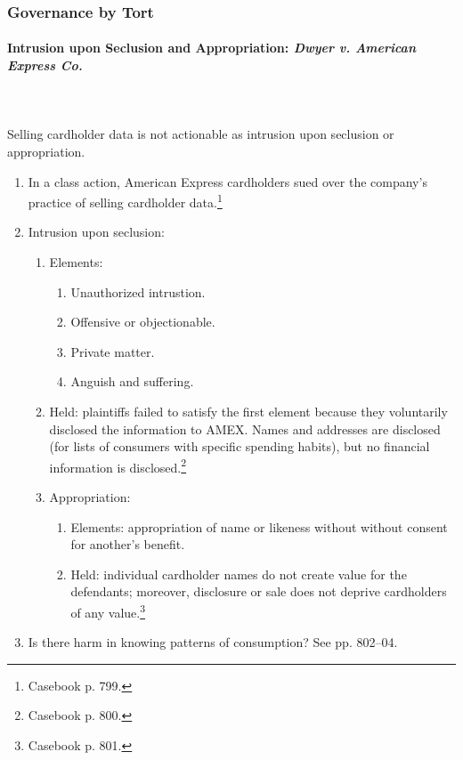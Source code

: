 \subsubsection{Governance by Tort}

\paragraph{Intrusion upon Seclusion and Appropriation: \emph{Dwyer v. American 
Express Co.}}
~\\\\
Selling cardholder data is not actionable as intrusion upon seclusion or 
appropriation.

\begin{enumerate}
    \item In a class action, American Express cardholders sued over the 
    company's practice of selling cardholder data.\footnote{Casebook p. 799.}
    \item Intrusion upon seclusion:
    \begin{enumerate}
        \item Elements:
        \begin{enumerate}
            \item Unauthorized intrustion.
            \item Offensive or objectionable.
            \item Private matter.
            \item Anguish and suffering.
        \end{enumerate}
        \item Held: plaintiffs failed to satisfy the first element because they 
        voluntarily disclosed the information to AMEX. Names and addresses are 
        disclosed (for lists of consumers with specific spending habits), but no 
        financial information is disclosed.\footnote{Casebook p. 800.}
        \item Appropriation:
        \begin{enumerate}
            \item Elements: appropriation of name or likeness without without 
            consent for another's benefit.
            \item Held: individual cardholder names do not create value for the 
            defendants; moreover, disclosure or sale does not deprive 
            cardholders of any value.\footnote{Casebook p. 801.}
        \end{enumerate}
    \end{enumerate}
    \item Is there harm in knowing patterns of consumption? See pp. 802--04.
\end{enumerate}

